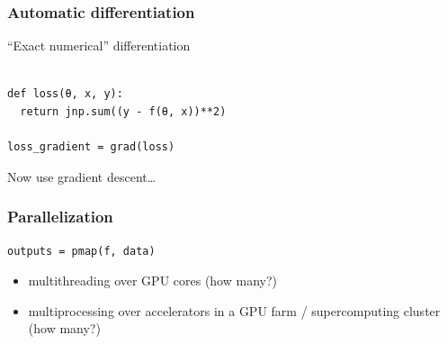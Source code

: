 \documentclass[
    xcolor={svgnames,dvipsnames},
    hyperref={colorlinks, citecolor=DeepPink4, linkcolor=DarkRed, urlcolor=DarkBlue}
    ]{beamer}  %
\newcommand{\1}{\mathbbm 1}
\begin{document}
\begin{frame}[fragile]
    \frametitle{Automatic differentiation}

    \vspace{0.5em}
    ``Exact numerical'' differentiation
    
    \begin{verbatim}

def loss(θ, x, y):
  return jnp.sum((y - f(θ, x))**2)

loss_gradient = grad(loss)

    \end{verbatim}

    \vspace{0.5em}
    \vspace{0.5em}
    \vspace{0.5em}
    Now use gradient descent\ldots


\end{frame}


\begin{frame}[fragile]
    \frametitle{Parallelization}

    
    \begin{verbatim}
outputs = pmap(f, data)  
    \end{verbatim}

    \vspace{0.5em}
    \vspace{0.5em}
    \begin{itemize}
        \item multithreading over GPU cores (how many?)
        \vspace{0.5em}
        \item multiprocessing over accelerators in a GPU farm / supercomputing
            cluster (how many?)
    \end{itemize}

\end{frame}


\begin{frame}
    
    \begin{figure}
       \begin{center}
       \end{center}
    \end{figure}


\end{frame}
\end{document}

